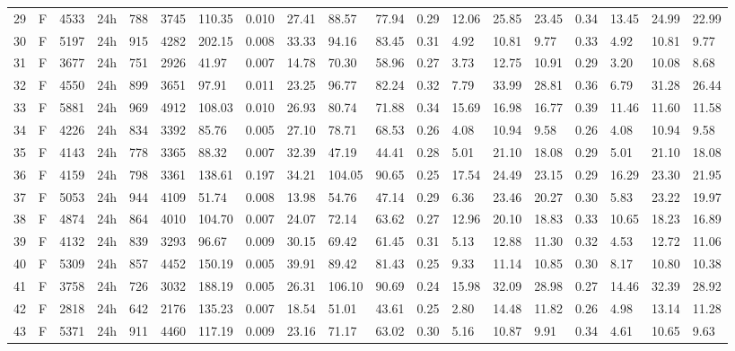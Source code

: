 \begin{tabular}{rllllllrlllllllllll}
29 & F & 4533 & 24h & 788 & 3745 & 110.35 & 0.010 & 27.41 & 88.57 & 77.94 & 0.29 & 12.06 & 25.85 & 23.45 & 0.34 & 13.45 & 24.99 & 22.99 \\
30 & F & 5197 & 24h & 915 & 4282 & 202.15 & 0.008 & 33.33 & 94.16 & 83.45 & 0.31 & 4.92 & 10.81 & 9.77 & 0.33 & 4.92 & 10.81 & 9.77 \\
31 & F & 3677 & 24h & 751 & 2926 & 41.97 & 0.007 & 14.78 & 70.30 & 58.96 & 0.27 & 3.73 & 12.75 & 10.91 & 0.29 & 3.20 & 10.08 & 8.68 \\
32 & F & 4550 & 24h & 899 & 3651 & 97.91 & 0.011 & 23.25 & 96.77 & 82.24 & 0.32 & 7.79 & 33.99 & 28.81 & 0.36 & 6.79 & 31.28 & 26.44 \\
33 & F & 5881 & 24h & 969 & 4912 & 108.03 & 0.010 & 26.93 & 80.74 & 71.88 & 0.34 & 15.69 & 16.98 & 16.77 & 0.39 & 11.46 & 11.60 & 11.58 \\
34 & F & 4226 & 24h & 834 & 3392 & 85.76 & 0.005 & 27.10 & 78.71 & 68.53 & 0.26 & 4.08 & 10.94 & 9.58 & 0.26 & 4.08 & 10.94 & 9.58 \\
35 & F & 4143 & 24h & 778 & 3365 & 88.32 & 0.007 & 32.39 & 47.19 & 44.41 & 0.28 & 5.01 & 21.10 & 18.08 & 0.29 & 5.01 & 21.10 & 18.08 \\
36 & F & 4159 & 24h & 798 & 3361 & 138.61 & 0.197 & 34.21 & 104.05 & 90.65 & 0.25 & 17.54 & 24.49 & 23.15 & 0.29 & 16.29 & 23.30 & 21.95 \\
37 & F & 5053 & 24h & 944 & 4109 & 51.74 & 0.008 & 13.98 & 54.76 & 47.14 & 0.29 & 6.36 & 23.46 & 20.27 & 0.30 & 5.83 & 23.22 & 19.97 \\
38 & F & 4874 & 24h & 864 & 4010 & 104.70 & 0.007 & 24.07 & 72.14 & 63.62 & 0.27 & 12.96 & 20.10 & 18.83 & 0.33 & 10.65 & 18.23 & 16.89 \\
39 & F & 4132 & 24h & 839 & 3293 & 96.67 & 0.009 & 30.15 & 69.42 & 61.45 & 0.31 & 5.13 & 12.88 & 11.30 & 0.32 & 4.53 & 12.72 & 11.06 \\
40 & F & 5309 & 24h & 857 & 4452 & 150.19 & 0.005 & 39.91 & 89.42 & 81.43 & 0.25 & 9.33 & 11.14 & 10.85 & 0.30 & 8.17 & 10.80 & 10.38 \\
41 & F & 3758 & 24h & 726 & 3032 & 188.19 & 0.005 & 26.31 & 106.10 & 90.69 & 0.24 & 15.98 & 32.09 & 28.98 & 0.27 & 14.46 & 32.39 & 28.92 \\
42 & F & 2818 & 24h & 642 & 2176 & 135.23 & 0.007 & 18.54 & 51.01 & 43.61 & 0.25 & 2.80 & 14.48 & 11.82 & 0.26 & 4.98 & 13.14 & 11.28 \\
43 & F & 5371 & 24h & 911 & 4460 & 117.19 & 0.009 & 23.16 & 71.17 & 63.02 & 0.30 & 5.16 & 10.87 & 9.91 & 0.34 & 4.61 & 10.65 & 9.63 \\

\end{tabular}
